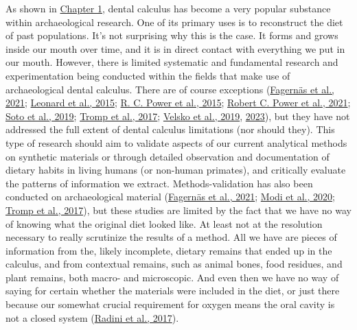 \documentclass[
  letterpaper,
]{book}
\begin{document}
As shown in \protect\hyperlink{fig-plot-and-wordclouds}{Chapter 1},
dental calculus has become a very popular substance within
archaeological research. One of its primary uses is to reconstruct the
diet of past populations. It's not surprising why this is the case. It
forms and grows inside our mouth over time, and it is in direct contact
with everything we put in our mouth. However, there is limited
systematic and fundamental research and experimentation being conducted
within the fields that make use of archaeological dental calculus. There
are of course exceptions
(\protect\hyperlink{ref-fagernasMicrobialBiogeography2021}{Fagernäs et
al., 2021}; \protect\hyperlink{ref-leonardPlantMicroremains2015}{Leonard
et al., 2015}; \protect\hyperlink{ref-powerChimpCalculus2015}{R. C.
Power et al., 2015};
\protect\hyperlink{ref-powerRepresentativenessDental2021}{Robert C.
Power et al., 2021};
\protect\hyperlink{ref-sotoCharacterizationDecontamination2019}{Soto et
al., 2019}; \protect\hyperlink{ref-trompEDTACalculus2017}{Tromp et al.,
2017}; \protect\hyperlink{ref-velskoMicrobialDifferences2019}{Velsko et
al., 2019}, \protect\hyperlink{ref-velskoHighConservation2023}{2023}),
but they have not addressed the full extent of dental calculus
limitations (nor should they). This type of research should aim to
validate aspects of our current analytical methods on synthetic
materials or through detailed observation and documentation of dietary
habits in living humans (or non-human primates), and critically evaluate
the patterns of information we extract. Methods-validation has also been
conducted on archaeological material
(\protect\hyperlink{ref-fagernasMicrobialBiogeography2021}{Fagernäs et
al., 2021}; \protect\hyperlink{ref-modiCalculusMethodologies2020}{Modi
et al., 2020}; \protect\hyperlink{ref-trompEDTACalculus2017}{Tromp et
al., 2017}), but these studies are limited by the fact that we have no
way of knowing what the original diet looked like. At least not at the
resolution necessary to really scrutinize the results of a method. All
we have are pieces of information from the, likely incomplete, dietary
remains that ended up in the calculus, and from contextual remains, such
as animal bones, food residues, and plant remains, both macro- and
microscopic. And even then we have no way of saying for certain whether
the materials were included in the diet, or just there because our
somewhat crucial requirement for oxygen means the oral cavity is not a
closed system (\protect\hyperlink{ref-radiniFoodPathways2017}{Radini et
al., 2017}).
\end{document}
